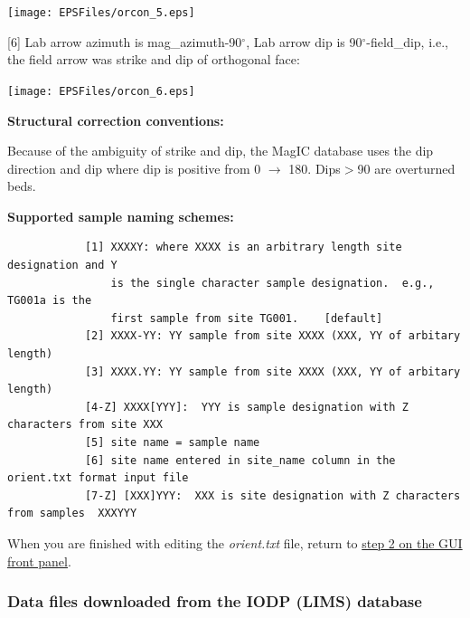 \documentclass[11pt]{book}
\begin{document}
{{               \texttt{[image: EPSFiles/orcon\_5.eps]}


 [6] Lab arrow azimuth is mag\_azimuth-90$^{\circ}$, Lab arrow dip is 90$^{\circ}$-field\_dip, i.e., the field arrow was strike and dip of orthogonal face:

                \texttt{[image: EPSFiles/orcon\_6.eps]}
                }

{\bf Structural correction conventions:}


Because of the ambiguity of strike and dip, the MagIC database uses the dip direction and dip where dip is positive from 0 $\rightarrow$ 180. Dips$ > $90 are overturned beds.



{\bf Supported sample naming schemes:}

\begin{verbatim}
            [1] XXXXY: where XXXX is an arbitrary length site designation and Y
                is the single character sample designation.  e.g., TG001a is the
                first sample from site TG001.    [default]
            [2] XXXX-YY: YY sample from site XXXX (XXX, YY of arbitary length)
            [3] XXXX.YY: YY sample from site XXXX (XXX, YY of arbitary length)
            [4-Z] XXXX[YYY]:  YYY is sample designation with Z characters from site XXX
            [5] site name = sample name
            [6] site name entered in site_name column in the orient.txt format input file
            [7-Z] [XXX]YYY:  XXX is site designation with Z characters from samples  XXXYYY
\end{verbatim}

When you are finished with editing the {\it orient.txt} file,  return to  \href{#orient}{step 2 on the GUI front panel}.


%
%
%
%


\subsubsection{Data files downloaded from the IODP (LIMS) database}


}
\end{document}

